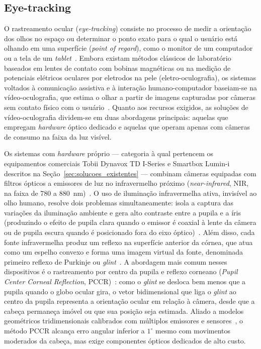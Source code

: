 \subsection{Eye-tracking} \label{sec:eyetracking}

O rastreamento ocular (\textit{eye-tracking}) consiste no processo de medir a orientação dos olhos no espaço ou determinar o ponto exato para o qual o usuário está olhando em uma superfície (\textit{point of regard}), como o monitor de um computador ou a tela de um \textit{tablet}~\cite{hansen2010in}. Embora existam métodos clássicos de laboratório baseados em lentes de contato com bobinas magnéticas ou na medição de potenciais elétricos oculares por eletrodos na pele (eletro-oculografia), os sistemas voltados à comunicação assistiva e à interação humano-computador baseiam-se na vídeo-oculografia, que estima o olhar a partir de imagens capturadas por câmeras sem contato físico com o usuário~\cite{hansen2010in}. Quanto aos recursos exigidos, as soluções de vídeo-oculografia dividem-se em duas abordagens principais: aquelas que empregam \textit{hardware} óptico dedicado e aquelas que operam apenas com câmeras de consumo na faixa da luz visível.

Os sistemas com \textit{hardware} próprio --- categoria à qual pertencem os equipamentos comerciais Tobii Dynavox TD I-Series e Smartbox Lumin-i descritos na Seção~\ref{sec:solucoes_existentes} --- combinam câmeras equipadas com filtros ópticos a emissores de luz no infravermelho próximo (\textit{near-infrared}, NIR, na faixa de 780 a 880~nm)~\cite{guestrin2006general,hansen2010in}. O uso de iluminação infravermelha ativa, invisível ao olho humano, resolve dois problemas simultaneamente: isola a captura das variações da iluminação ambiente e gera alto contraste entre a pupila e a íris (produzindo o efeito de pupila clara quando o emissor é coaxial à lente da câmera ou de pupila escura quando é posicionado fora do eixo óptico)~\cite{hansen2010in}. Além disso, cada fonte infravermelha produz um reflexo na superfície anterior da córnea, que atua como um espelho convexo e forma uma imagem virtual da fonte, denominada primeiro reflexo de Purkinje ou \textit{glint}~\cite{guestrin2006general}. A abordagem mais comum nesses dispositivos é o rastreamento por centro da pupila e reflexo corneano (\textit{Pupil Center Corneal Reflection}, PCCR)~\cite{guestrin2006general,hansen2010in}: como o \textit{glint} se desloca bem menos que a pupila quando o globo ocular gira, o vetor bidimensional que liga o \textit{glint} ao centro da pupila representa a orientação ocular em relação à câmera, desde que a cabeça permaneça imóvel ou que sua posição seja estimada. Aliado a modelos geométricos tridimensionais calibrados com múltiplos emissores e sensores~\cite{guestrin2006general}, o método PCCR alcança erro angular inferior a $1^\circ$ mesmo com movimentos moderados da cabeça, mas exige componentes ópticos dedicados de alto custo.

